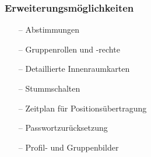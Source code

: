 \documentclass[aspectratio=1610]{beamer}
\begin{document}
  \begin{frame}[plain]
      \frametitle{\textbf{Erweiterungsmöglichkeiten}}
        \begin{itemize}
          \item[--] Abstimmungen
          \item[--] Gruppenrollen und -rechte
          \item[--] Detaillierte Innenraumkarten
          \item[--] Stummschalten
          \item[--] Zeitplan für Positionsübertragung
          \item[--] Passwortzurücksetzung
          \item[--] Profil- und Gruppenbilder
        \end{itemize}
  \end{frame}
\end{document}

